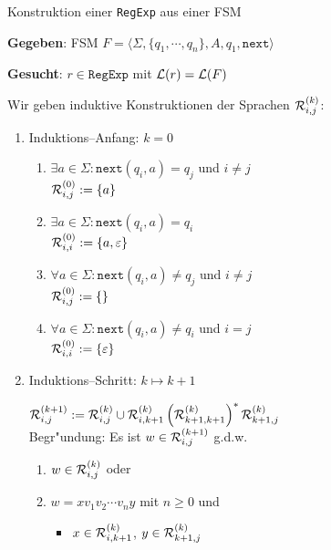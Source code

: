 
\begin{slide}{}
\normalsize

\begin{center}
Konstruktion einer \texttt{RegExp} aus einer FSM 
\end{center}

\footnotesize
\textbf{Gegeben}: FSM $F = \langle \Sigma, \{q_1,\cdots,q_n\}, A, q_1, \mathtt{next} \rangle$

\textbf{Gesucht}: $r \in \mathtt{RegExp}$ mit ${\cal L}(r) = {\cal L}(F)$

Wir geben induktive Konstruktionen der  Sprachen
 ${\cal R}_{i,j}^{(k)}$: 
\begin{enumerate}
\item Induktions--Anfang: $k=0$
  \begin{enumerate}
  \item $\exists a \in \Sigma:\mathtt{next}(q_i, a) = q_j$ und $i\not=j$\\[0.3cm]
        \hspace*{1.3cm} ${\cal R}_{i,j}^{(0)} := \{a\}$
  \item $\exists a \in \Sigma:\mathtt{next}(q_i, a) = q_i$ \\[0.3cm]
        \hspace*{1.3cm} ${\cal R}_{i,i}^{(0)} := \{a,\varepsilon\}$
  \item $\forall a \in \Sigma:\mathtt{next}(q_i, a) \not= q_j$ und $i\not=j$ \\[0.3cm]
        \hspace*{1.3cm} ${\cal R}_{i,j}^{(0)} := \{\}$
  \item $\forall a \in \Sigma:\mathtt{next}(q_i, a) \not= q_i$ und $i=j$ \\[0.3cm]
        \hspace*{1.3cm} ${\cal R}_{i,i}^{(0)} := \{\varepsilon\}$
  \end{enumerate}
\item Induktions--Schritt: $k \mapsto k + 1$ 

     \hspace*{1.3cm} ${\cal R}_{i,j}^{(k+1)} := {\cal R}_{i,j}^{(k)} \cup {\cal R}_{i,k+1}^{(k)} \left({\cal R}_{k+1,k+1}^{(k)}\right)^* {\cal R}_{k+1,j}^{(k)}$     \\[0.5cm]
     Begr"undung: Es ist $w \in {\cal R}_{i,j}^{(k+1)}$ g.d.w. 
     \begin{enumerate}
     \item $w \in {\cal R}_{i,j}^{(k)}$ oder
     \item $w =x v_1v_2 \cdots v_n y$ mit $n\geq 0$ und
       \begin{itemize}
       \item $x \in {\cal R}_{i,k+1}^{(k)}$, \quad $y \in {\cal R}_{k+1,j}^{(k)}$


\end{itemize}
\end{enumerate}
\end{enumerate}
\end{slide}
